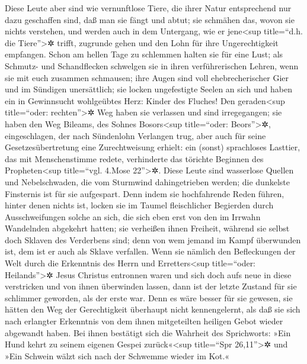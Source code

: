  Diese Leute aber sind wie vernunftlose Tiere, die ihrer
Natur entsprechend nur dazu geschaffen sind, daß man sie fängt und
abtut; sie schmähen das, wovon sie nichts verstehen, und werden auch in
dem Untergang, wie er jene\textless sup title=``d.h. die
Tiere''\textgreater✲ trifft, zugrunde gehen  und den Lohn
für ihre Ungerechtigkeit empfangen. Schon am hellen Tage zu schlemmen
halten sie für eine Lust; als Schmutz- und Schandflecken schwelgen sie
in ihren verführerischen Lehren, wenn sie mit euch zusammen schmausen;
 ihre Augen sind voll ehebrecherischer Gier und im
Sündigen unersättlich; sie locken ungefestigte Seelen an sich und haben
ein in Gewinnsucht wohlgeübtes Herz: Kinder des Fluches! 
Den geraden\textless sup title=``oder: rechten''\textgreater✲ Weg haben
sie verlassen und sind irregegangen; sie haben den Weg Bileams, des
Sohnes Bosors\textless sup title=``oder: Beors''\textgreater✲,
eingeschlagen, der nach Sündenlohn Verlangen trug,  aber
auch für seine Gesetzesübertretung eine Zurechtweisung erhielt: ein
(sonst) sprachloses Lasttier, das mit Menschenstimme redete, verhinderte
das törichte Beginnen des Propheten\textless sup title=``vgl. 4.Mose
22''\textgreater✲.  Diese Leute sind wasserlose Quellen
und Nebelschwaden, die vom Sturmwind dahingetrieben werden; die
dunkelste Finsternis ist für sie aufgespart.  Denn indem
sie hochfahrende Reden führen, hinter denen nichts ist, locken sie im
Taumel fleischlicher Begierden durch Ausschweifungen solche an sich, die
sich eben erst von den im Irrwahn Wandelnden abgekehrt hatten;
 sie verheißen ihnen Freiheit, während sie selbst doch
Sklaven des Verderbens sind; denn von wem jemand im Kampf überwunden
ist, dem ist er auch als Sklave verfallen.  Wenn sie
nämlich den Befleckungen der Welt durch die Erkenntnis des Herrn und
Erretters\textless sup title=``oder: Heilands''\textgreater✲ Jesus
Christus entronnen waren und sich doch aufs neue in diese verstricken
und von ihnen überwinden lassen, dann ist der letzte Zustand für sie
schlimmer geworden, als der erste war.  Denn es wäre
besser für sie gewesen, sie hätten den Weg der Gerechtigkeit überhaupt
nicht kennengelernt, als daß sie sich nach erlangter Erkenntnis von dem
ihnen mitgeteilten heiligen Gebot wieder abgewandt haben.
 Bei ihnen bestätigt sich die Wahrheit des Sprichworts:
»Ein Hund kehrt zu seinem eigenen Gespei zurück«\textless sup
title=``Spr 26,11''\textgreater✲ und »Ein Schwein wälzt sich nach der
Schwemme wieder im Kot.«

